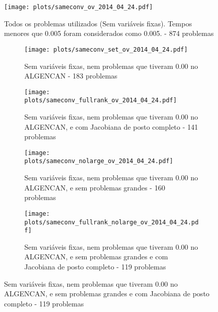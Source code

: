 \documentclass{article}
\begin{document}
\begin{figure}[H]
  \centering
  \texttt{[image: plots/sameconv\_ov\_2014\_04\_24.pdf]}
  \caption{Todos os problemas utilizados (Sem variáveis fixas). Tempos menores
    que 0.005 foram considerados como 0.005. - 874 problemas}
\end{figure}
\begin{figure}[H]
  \centering
  \begin{subfigure}{0.48\textwidth}
    \texttt{[image: plots/sameconv\_set\_ov\_2014\_04\_24.pdf]}
    \caption{Sem variáveis fixas, nem problemas
      que tiveram 0.00 no ALGENCAN - 183 problemas}
  \end{subfigure}
  \begin{subfigure}{0.48\textwidth}
    \texttt{[image: plots/sameconv\_fullrank\_ov\_2014\_04\_24.pdf]}
    \caption{Sem variáveis fixas, nem problemas
      que tiveram 0.00 no ALGENCAN, e com Jacobiana de posto completo - 141
      problemas}
  \end{subfigure}
  \begin{subfigure}{0.48\textwidth}
    \texttt{[image: plots/sameconv\_nolarge\_ov\_2014\_04\_24.pdf]}
    \caption{Sem variáveis fixas, nem problemas
      que tiveram 0.00 no ALGENCAN, e sem problemas grandes - 160 problemas}
  \end{subfigure}
  \begin{subfigure}{0.48\textwidth}
    \texttt{[image: plots/sameconv\_fullrank\_nolarge\_ov\_2014\_04\_24.pdf]}
    \caption{Sem variáveis fixas, nem problemas
      que tiveram 0.00 no ALGENCAN, e sem problemas grandes e com Jacobiana de
      posto completo - 119 problemas}
  \end{subfigure}
\end{figure}



\end{document}

